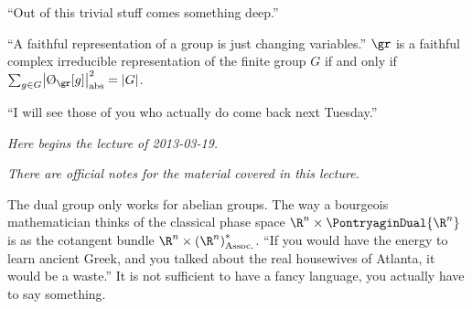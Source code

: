 \documentclass[10pt]{article}
\newcommand{\Rn}{{\R^n}}
\newcommand{\lectureStart}[1]{

\begin{flushright}
\emph{Here begins the lecture of #1.}
\end{flushright}

}
\newcommand{\lectureEnd}[1]{

}
\newcommand{\officialNotes}{

\begin{flushleft}
\emph{There are official notes for the material covered in this lecture.}
\end{flushleft}

}
\begin{document}
``Out of this trivial stuff comes something deep.''

``A faithful representation of a group is just changing variables.''
$\gr$ is a faithful complex irreducible representation of the finite group $G$ if and only if $\sum{g\in G} \abs{\Character[\gr]\of g}^2 = \Cardinality G$.

``I will see those of you who actually do come back next Tuesday.''
\lectureEnd{2013-03-14}
\lectureStart{2013-03-19}
\officialNotes
The dual group only works for abelian groups. 
The way a bourgeois mathematician thinks of the classical phase space $\Rn\Cartesian\PontryaginDual\Rn$ is as the cotangent bundle $\Rn\Cartesian\Dual{\pa\Rn}$.
``If you would have the energy to learn ancient Greek, and you talked about the real housewives of Atlanta, it would be a waste.'' It is not sufficient to have a fancy language, you actually have to say something.
\end{document}
